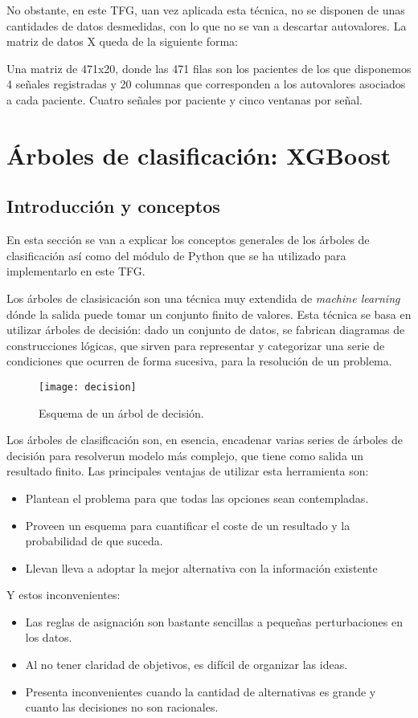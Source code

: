 No obstante, en este TFG, uan vez aplicada esta técnica, no se disponen de unas cantidades de datos desmedidas, con lo que no se van a descartar autovalores. La matriz de datos X queda de la siguiente forma: \par 

Una matriz de 471x20, donde las 471 filas son los pacientes de los que disponemos 4 señales registradas y 20 columnas que corresponden a los autovalores asociados a cada paciente. Cuatro señales por paciente y cinco ventanas por señal.

\section{Árboles de clasificación: XGBoost}

\subsection{Introducción y conceptos}
En esta sección se van a explicar los conceptos generales de los árboles de clasificación así como del módulo de Python que se ha utilizado para implementarlo en este TFG.\par 

Los árboles de clasisicación son una técnica muy extendida de \textit{machine learning} dónde la salida puede tomar un conjunto finito de valores. Esta técnica se basa en utilizar árboles de decisión: dado un conjunto de datos, se fabrican diagramas de construcciones lógicas, que sirven para representar y categorizar una serie de condiciones que ocurren de forma sucesiva, para la resolución de un problema.\cite{decision_trees}\par 

\begin{figure}[h]
	\centering
	\texttt{[image: decision]}
	\caption{Esquema de un árbol de decisión.}
	\label{fig:decision_tree}
\end{figure}

Los árboles de clasificación son, en esencia, encadenar varias series de árboles de decisión para resolverun modelo más complejo, que tiene como salida un resultado finito. Las principales ventajas de utilizar esta herramienta son:\cite{ventajas_trees}
\begin{itemize}
\item Plantean el problema para que todas las opciones sean contempladas.
\item Proveen un esquema para cuantificar el coste de un resultado y la probabilidad de que suceda.
\item Llevan lleva a adoptar la mejor alternativa con la información existente
\end{itemize}
Y estos inconvenientes:
\begin{itemize}
\item Las reglas de asignación son bastante sencillas a pequeñas perturbaciones en los datos.
\item Al no tener claridad de objetivos, es difícil de organizar las ideas.
\item Presenta inconvenientes cuando la cantidad de alternativas es grande y cuanto las decisiones no son racionales.
\end{itemize}

